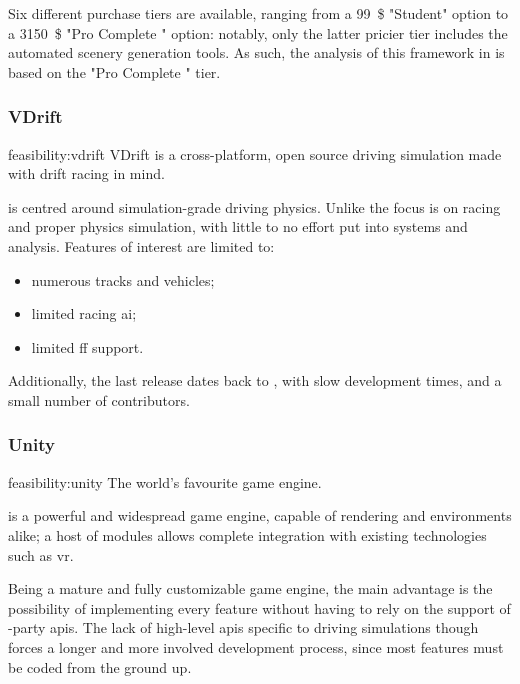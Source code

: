 Six different purchase tiers are available, ranging from a \SI{99}{\$} "Student" option to a \SI{3150}{\$} "Pro Complete " option: notably, only the latter pricier tier includes the automated scenery generation tools. As such, the analysis of this \gls{framework} in  is based on the "Pro Complete " tier.

\subsubsection{VDrift}

\begin{excerpt}{feasibility:vdrift}
    VDrift is a cross-platform, open source driving simulation made with drift racing in mind.
\end{excerpt}

 is centred around simulation-grade driving physics. Unlike  the focus is on racing and proper physics simulation, with little to no effort put into systems and analysis. Features of interest are limited to:

\begin{itemize}
	\item numerous tracks and vehicles;
    \item limited racing \gls{ai};
    \item limited \gls{ff} support.
\end{itemize}

Additionally, the last release dates back to , with slow development times, and a small number of contributors.

\subsubsection{Unity}

\begin{excerpt}{feasibility:unity}
    The world's favourite game engine.
\end{excerpt}

 is a powerful and widespread game engine, capable of rendering  and  environments alike; a host of modules allows complete integration with existing technologies such as \gls{vr}.

Being a mature and fully customizable game engine, the main advantage is the possibility of implementing every \gls{feature} without having to rely on the support of -party \glspl{api}. The lack of high-level \glspl{api} specific to driving simulations though forces a longer and more involved development process, since most \glspl{feature} must be coded from the ground up.

